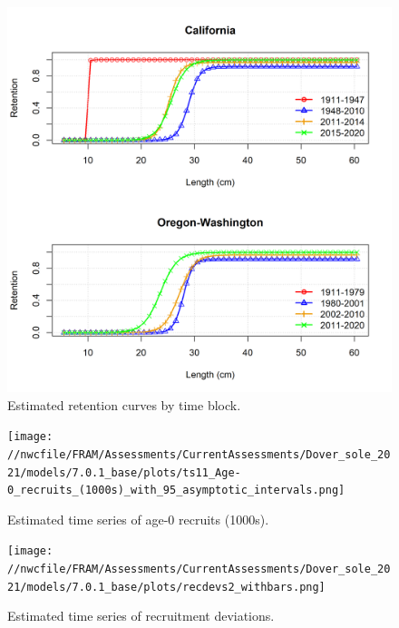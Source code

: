 \documentclass[11pt,
  english,
  a4paper,
]{article}
\begin{document}
\begin{figure}
\centering
\includegraphics[width=1\textwidth,height=1\textheight]{figs/dover_retention.png}
\caption{Estimated retention curves by time block.\label{fig:retention}}
\end{figure}

\tagmcend\tagstructend


\begin{figure}
\centering
\texttt{[image: //nwcfile/FRAM/Assessments/CurrentAssessments/Dover\_sole\_2021/models/7.0.1\_base/plots/ts11\_Age-0\_recruits\_(1000s)\_with\_95\_asymptotic\_intervals.png]}
\caption{Estimated time series of age-0 recruits (1000s).\label{fig:recruits}}
\end{figure}

\tagmcend\tagstructend


\begin{figure}
\centering
\texttt{[image: //nwcfile/FRAM/Assessments/CurrentAssessments/Dover\_sole\_2021/models/7.0.1\_base/plots/recdevs2\_withbars.png]}
\caption{Estimated time series of recruitment deviations.\label{fig:rec-devs}}
\end{figure}
\end{document}
